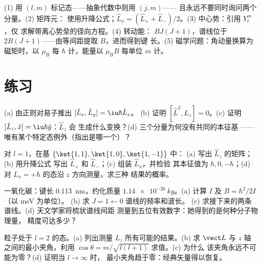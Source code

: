 \begin{method}[角动量的实际应用]\label{met:b3:quantum-angular-momentum:method}
(1) 用 $(l, m)$ 标记态——抽象代数中则用 $(j, m)$——
且永远不要同时询问两个分量。(2) 矩阵元：
使用升降公式；$\hat L_x = (\hat L_+ + \hat
L_-)/2$。(3) 中心势：引用 $Y_l^m$，仅
求解带离心势垒的径向方程。(4) 转动能：
$BJ(J+1)$，谱线位于 $2B(J+1)$——由等间距提取 $B$，进而得到键
长。(5) 磁学问题：角动量换算为磁矩时，以
$\mu_{\text{B}}$ 每 $\hbar$ 计，能量以
$\mu_{\text{B}}B$ 每单位 $m$ 计。
\end{method}

\section{练习}

\begin{exercise}[$\star$]\label{exo:b3:quantum-angular-momentum:1}
(a) 由正则对易子推出 $[\hat L_x, \hat L_y] = \iu\hbar\hat L_z$。
(b) 证明 $[\hat L^2, \hat L_z] = 0$。(c) 证明
$[\hat L_z, \hat x] = \iu\hbar\hat y$：$\hat L_z$ 会
生成什么变换？(d) 三个分量为何没有共同的本征基
——唯有某个特定态例外（指出是哪一个）？
\end{exercise}

\begin{exercise}[$\star$]\label{exo:b3:quantum-angular-momentum:2}
对 $l = 1$，在基 $\{\ket{1,1}, \ket{1,0}, \ket{1,-1}\}$ 中：
(a) 写出 $\hat L_z$ 的矩阵；(b) 用升降公式
写出 $\hat L_+$ 和 $\hat L_-$；(c) 组装 $\hat L_x$，并检验
其本征值为 $\hbar, 0, -\hbar$；(d) 对 $L_x =
+\hbar$ 的态沿 $z$ 方向测量，求三种
结果的概率。
\end{exercise}

\begin{exercise}[$\star$]\label{exo:b3:quantum-angular-momentum:3}
一氧化碳：键长 \qty{0.113}{nm}，约化质量
$\qty{1.14e-26}{kg}$。(a) 计算 $I$ 及 $B = \hbar^2/2I$（以 meV 为单位）。
(b) 求 $J = 1 \leftarrow 0$ 谱线的频率和波长。
(c) 求接下来的两条谱线。(d) 天文学家将梳状谱线间距
测量到五位有效数字：她得到的是何种分子物理量，
精度可达多少？
\end{exercise}

\begin{exercise}[$\star$]\label{exo:b3:quantum-angular-momentum:4}
粒子处于 $l = 2$ 的态。(a) 列出测量
$L_z$ 所有可能的结果。(b) 求 $\vect L$ 与
$z$ 轴之间的最小夹角，利用 $\cos\theta = m/\sqrt{l(l+1)}$ 求值。(c) 为什么
该夹角永远不可能为零？(d) 证明当 $l \to \infty$ 时，
最小夹角趋于零：经典矢量得以恢复。
\end{exercise}

